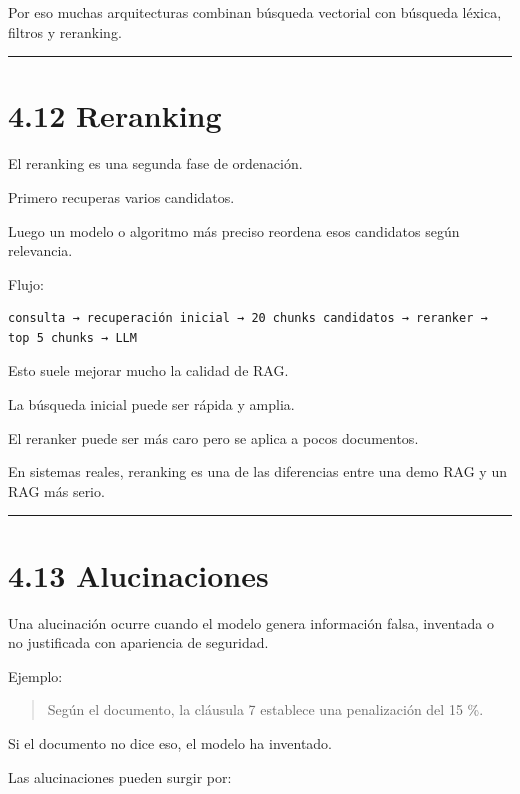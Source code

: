 Por eso muchas arquitecturas combinan búsqueda vectorial con búsqueda
léxica, filtros y reranking.

\begin{center}\rule{0.5\linewidth}{0.5pt}\end{center}

\section{4.12 Reranking}\label{reranking}

El reranking es una segunda fase de ordenación.

Primero recuperas varios candidatos.

Luego un modelo o algoritmo más preciso reordena esos candidatos según
relevancia.

Flujo:

\begin{lstlisting}
consulta → recuperación inicial → 20 chunks candidatos → reranker → top 5 chunks → LLM
\end{lstlisting}

Esto suele mejorar mucho la calidad de RAG.

La búsqueda inicial puede ser rápida y amplia.

El reranker puede ser más caro pero se aplica a pocos documentos.

En sistemas reales, reranking es una de las diferencias entre una demo
RAG y un RAG más serio.

\begin{center}\rule{0.5\linewidth}{0.5pt}\end{center}

\section{4.13 Alucinaciones}\label{alucinaciones}

Una alucinación ocurre cuando el modelo genera información falsa,
inventada o no justificada con apariencia de seguridad.

Ejemplo:

\begin{quote}
Según el documento, la cláusula 7 establece una penalización del 15 \%.
\end{quote}

Si el documento no dice eso, el modelo ha inventado.

Las alucinaciones pueden surgir por:

